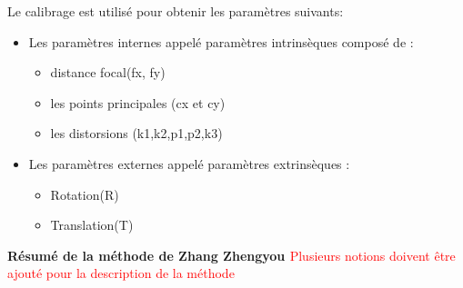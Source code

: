\documentclass[12pt,a4paper]{report}
\begin{document}
Le calibrage est utilisé pour obtenir les paramètres suivants:
\begin{itemize}
	\item Les paramètres internes appelé paramètres intrinsèques composé de :
	\begin{itemize}
		\item distance focal(fx, fy)
		\item les points principales (cx et cy)
		\item les distorsions (k1,k2,p1,p2,k3)
	\end{itemize}
	\item Les paramètres externes appelé paramètres extrinsèques :
		\begin{itemize}
		\item Rotation(R)
		\item Translation(T)
	\end{itemize}
	
\end{itemize}



\begin{center}
	\textbf{Résumé de la méthode de Zhang Zhengyou \cite{zhengyou_zhang_flexible_1999}}\textcolor{red}{Plusieurs notions doivent être ajouté pour la description de la méthode}\\
\end{center}
\end{document}
